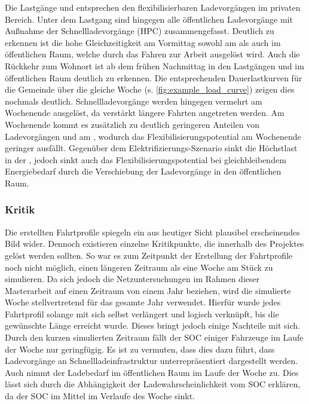 

Die Lastgänge \zH und \Firmeparkplatz entsprechen den flexibilisierbaren Ladevorgängen im privaten Bereich. Unter dem Lastgang \oeffen sind hingegen alle öffentlichen Ladevorgänge mit Außnahme der Schnellladevorgänge (\gls{HPC}) zusammengefasst. Deutlich zu erkennen ist die hohe Gleichzeitigkeit am Vormittag sowohl am \Firmeparkplatz als auch im öffentlichen Raum, welche durch das Fahren zur Arbeit ausgelöst wird.
Auch die Rückkehr zum Wohnort ist ab dem frühen Nachmittag in den Lastgängen \zH und im öffentlichen Raum deutlich zu erkennen. Die entsprechenden Dauerlastkurven für die Gemeinde über die gleiche Woche (s. \autoref{fig:example_load_curve}) zeigen dies nochmals deutlich.
Schnellladevorgänge werden hingegen vermehrt am Wochenende ausgelöst, da verstärkt längere Fahrten angetreten werden.
Am Wochenende kommt es zusätzlich zu deutlich geringeren Anteilen von Ladevorgängen \zH und am \Firmeparkplatzdot, wodurch das Flexibilisierungspotential am Wochenende geringer ausfällt.
Gegenüber dem Elektrifizierungs-Szenario sinkt die Höchstlast in der \SzeFirmenparkplatzdot, jedoch sinkt auch das Flexibilisierungspotential bei gleichbleibendem Energiebedarf durch die Verschiebung der Ladevorgänge in den öffentlichen Raum.




\subsubsection{Kritik}

Die erstellten Fahrtprofile spiegeln ein aus heutiger Sicht plausibel erscheinendes Bild wider.
Dennoch existieren einzelne Kritikpunkte, die innerhalb des \simbev Projektes gelöst werden sollten.
So war es zum Zeitpunkt der Erstellung der Fahrtprofile noch nicht möglich, einen längeren Zeitraum als eine Woche am Stück zu simulieren.
Da sich jedoch die Netzuntersuchungen im Rahmen dieser Masterarbeit auf einen Zeitraum von einem Jahr beziehen, wird die simulierte Woche stellvertretend für das gesamte Jahr verwendet.
Hierfür wurde jedes Fahrtprofil solange mit sich selbst verlängert und logisch verknüpft, bis die gewünschte Länge erreicht wurde.
Dieses bringt jedoch einige Nachteile mit sich.
Durch den kurzen simulierten Zeitraum fällt der \gls{SOC} einiger Fahrzeuge im Laufe der Woche nur geringfügig.
Es ist zu vermuten, dass dies dazu führt, dass Ladevorgänge an Schnellladeinfrastruktur un­ter­re­prä­sen­tiert dargestellt werden.
Auch nimmt der Ladebedarf im öffentlichen Raum im Laufe der Woche zu.
Dies lässt sich durch die Abhängigkeit der Ladewahrscheinlichkeit vom \gls{SOC} erklären, da der \gls{SOC} im Mittel im Verlaufe des Woche sinkt.


